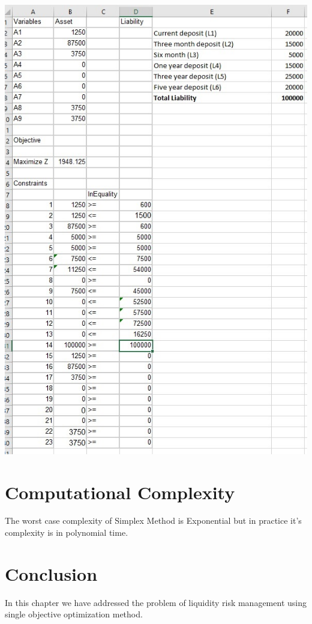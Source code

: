 				\begin{center}
				\includegraphics[width=\linewidth]{figures/LPP-Solution.jpg}	
				\label{fig: LPP Problem Solution in Excel}
				\end{center}

\section{Computational Complexity}
The worst case complexity of Simplex Method is Exponential but in practice it's complexity is in polynomial time.

\section{Conclusion }
In this chapter we have addressed the problem of liquidity risk management using single objective optimization method.








